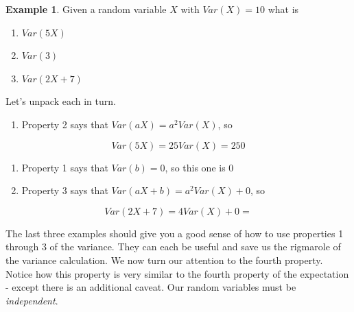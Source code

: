 \documentclass[
]{book}
\providecommand{\tightlist}{%
  \setlength{\itemsep}{0pt}\setlength{\parskip}{0pt}}
\theoremstyle{definition}
\theoremstyle{definition}
\newtheorem{example}{Example}[chapter]
\theoremstyle{definition}
\theoremstyle{definition}
\theoremstyle{remark}
\begin{document}
\begin{example}
Given a random variable \(X\) with \(Var(X) = 10\) what is

\begin{enumerate}
\def\labelenumi{\arabic{enumi}.}
\item
  \(Var(5X)\)
\item
  \(Var(3)\)
\item
  \(Var(2X + 7)\)
\end{enumerate}

Let's unpack each in turn.

\begin{enumerate}
\def\labelenumi{\arabic{enumi}.}
\tightlist
\item
  Property 2 says that \(Var(aX) = a^2Var(X)\), so
\end{enumerate}

\[
Var(5X) = 25Var(X) = 250
\]

\begin{enumerate}
\def\labelenumi{\arabic{enumi}.}
\setcounter{enumi}{1}
\item
  Property 1 says that \(Var(b) = 0\), so this one is \(0\)
\item
  Property 3 says that \(Var(aX + b) = a^2Var(X) + 0\), so
\end{enumerate}

\[
Var(2X + 7) = 4Var(X) + 0 = 
\]
\end{example}

The last three examples should give you a good sense of how to use properties 1 through 3 of the variance. They can each be useful and save us the rigmarole of the variance calculation. We now turn our attention to the fourth property. Notice how this property is very similar to the fourth property of the expectation - except there is an additional caveat. Our random variables must be \emph{independent}.
\end{document}
